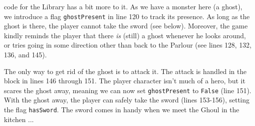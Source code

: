  code for the Library has a bit more to it. As we have a monster here (a ghost), we introduce a flag \texttt{ghostPresent} in line 120 to track its presence. As long as the ghost is there, the player cannot take the sword (see below). Moreover, the game kindly reminds the player that there \emph{is} (still) a ghost whenever he looks around, or tries going in some direction other than back to the Parlour (see lines 128, 132, 136, and 145).   

The only way to get rid of the ghost is to attack it. The attack is handled in the block in lines 146 through 151. The player character isn't much of a hero, but it scares the ghost away, meaning we can now set \texttt{ghostPresent} to \texttt{False} (line 151). With the ghost away, the player can safely take the sword (lines 153-156), setting the flag \texttt{hasSword}. The sword comes in handy when we meet the Ghoul in the kitchen ... 

 








   